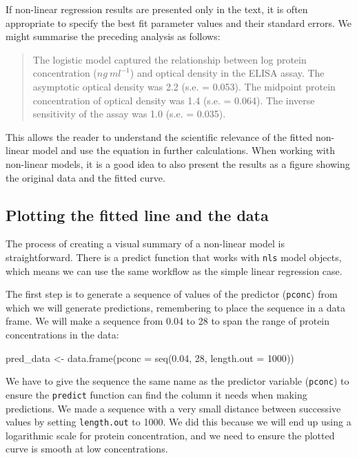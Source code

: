 \documentclass[
]{book}
\newenvironment{Shaded}{\begin{snugshade}}{\end{snugshade}}
\newcommand{\AttributeTok}[1]{\textcolor[rgb]{0.77,0.63,0.00}{#1}}
\newcommand{\DecValTok}[1]{\textcolor[rgb]{0.00,0.00,0.81}{#1}}
\newcommand{\FloatTok}[1]{\textcolor[rgb]{0.00,0.00,0.81}{#1}}
\newcommand{\FunctionTok}[1]{\textcolor[rgb]{0.00,0.00,0.00}{#1}}
\newcommand{\NormalTok}[1]{#1}
\newcommand{\OtherTok}[1]{\textcolor[rgb]{0.56,0.35,0.01}{#1}}
\begin{document}
If non-linear regression results are presented only in the text, it is often appropriate to specify the best fit parameter values and their standard errors. We might summarise the preceding analysis as follows:

\begin{quote}
The logistic model captured the relationship between log protein concentration (\(ng\ ml^{-1}\)) and optical density in the ELISA assay. The asymptotic optical density was 2.2 (s.e. = 0.053). The midpoint protein concentration of optical density was 1.4 (s.e. = 0.064). The inverse sensitivity of the assay was 1.0 (s.e. = 0.035).
\end{quote}

This allows the reader to understand the scientific relevance of the fitted non-linear model and use the equation in further calculations. When working with non-linear models, it is a good idea to also present the results as a figure showing the original data and the fitted curve.

\hypertarget{plotting-the-fitted-line-and-the-data-1}{%
\subsection{Plotting the fitted line and the data}\label{plotting-the-fitted-line-and-the-data-1}}

The process of creating a visual summary of a non-linear model is straightforward. There is a predict function that works with \texttt{nls} model objects, which means we can use the same workflow as the simple linear regression case.

The first step is to generate a sequence of values of the predictor (\texttt{pconc}) from which we will generate predictions, remembering to place the sequence in a data frame. We will make a sequence from 0.04 to 28 to span the range of protein concentrations in the data:

\begin{Shaded}
\begin{Highlighting}[]
\NormalTok{pred\_data }\OtherTok{\textless{}{-}} \FunctionTok{data.frame}\NormalTok{(}\AttributeTok{pconc =} \FunctionTok{seq}\NormalTok{(}\FloatTok{0.04}\NormalTok{, }\DecValTok{28}\NormalTok{, }\AttributeTok{length.out =} \DecValTok{1000}\NormalTok{))}
\end{Highlighting}
\end{Shaded}

We have to give the sequence the same name as the predictor variable (\texttt{pconc}) to ensure the \texttt{predict} function can find the column it needs when making predictions. We made a sequence with a very small distance between successive values by setting \texttt{length.out} to 1000. We did this because we will end up using a logarithmic scale for protein concentration, and we need to ensure the plotted curve is smooth at low concentrations.
\end{document}

